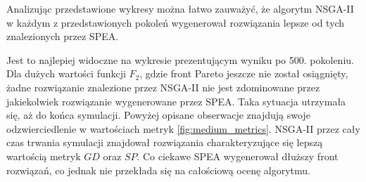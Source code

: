\documentclass[twoside]{iisthesis}
\begin{document}
Analizując przedstawione wykresy można łatwo zauważyć, że algorytm NSGA-II w każdym z przedstawionych pokoleń wygenerował rozwiązania lepsze od tych znalezionych przez SPEA.

Jest to najlepiej widoczne na wykresie prezentującym wyniku po 500. pokoleniu. Dla dużych wartości funkcji $F_{2}$, gdzie front Pareto jeszcze nie został osiągnięty, żadne rozwiązanie znalezione przez NSGA-II nie jest zdominowane przez jakiekolwiek rozwiązanie wygenerowane przez SPEA. Taka sytuacja utrzymała się, aż do końca symulacji.
Powyżej opisane obserwacje znajdują swoje odzwierciedlenie w wartościach metryk \eqref{fig:medium_metrics}. NSGA-II przez cały czas trwania symulacji znajdował rozwiązania charakteryzujące się lepszą wartością metryk $GD$ oraz $SP$. Co ciekawe SPEA wygenerował dłuższy front rozwiązań, co jednak nie przekłada się na całościową ocenę algorytmu.
\end{document}
